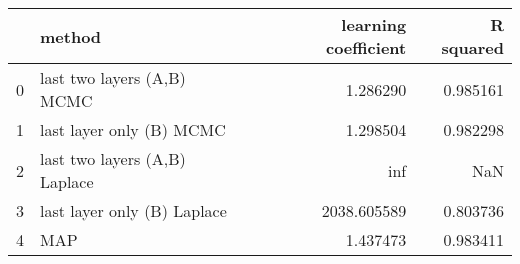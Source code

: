 \begin{tabular}{llrr}
\toprule
{} &                         method &  learning coefficient &  R squared \\
\midrule
0 &     last two layers (A,B) MCMC &              1.286290 &   0.985161 \\
1 &       last layer only (B) MCMC &              1.298504 &   0.982298 \\
2 &  last two layers (A,B) Laplace &                   inf &        NaN \\
3 &    last layer only (B) Laplace &           2038.605589 &   0.803736 \\
4 &                            MAP &              1.437473 &   0.983411 \\
\bottomrule
\end{tabular}
